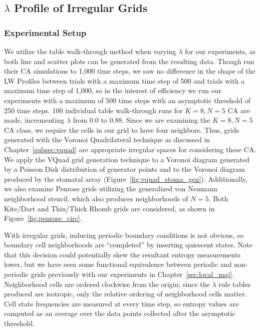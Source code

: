 \documentclass[a4paper,11pt]{article}
\begin{document}
\subsection{$\lambda$ Profile of Irregular Grids}

\subsubsection*{Experimental Setup}

We utilize the table walk-through method when varying $\lambda$ for our experiments, as both line and scatter plots can be generated from the resulting data. Though \citeauthor{wo90} run their CA simulations to 1,000 time steps, we saw no difference in the shape of the LW Profiles between trials with a maximum time step of 500 and trials with a maximum time step of 1,000, so in the interest of efficiency we run our experiments with a maximum of 500 time steps with an asymptotic threshold of 250 time steps. 100 individual table walk-through runs for $K=8, N=5$ CA are made, incrementing $\lambda$ from $0.0$ to $0.88$. Since we are examining the $K=8, N=5$ CA class, we require the cells in our grid to have four neighbors. Thus, grids generated with the Voronoi Quadrilateral technique as discussed in Chapter~\ref{subsec:vquad} are appropriate irregular spaces for considering these CA. We apply the VQuad grid generation technique to a Voronoi diagram generated by a Poisson Disk distribution of generator points and to the Voronoi diagram produced by the stomatal array (Figure~\ref{fig:vquad_stoma_gen}). Additionally, we also examine Penrose grids utilizing the generalized von Neumann neighborhood stencil, which also produces neighborhoods of $N=5$. Both Kite/Dart and Thin/Thick Rhomb grids are considered, as shown in Figure~\ref{fig:penrose_circ}.

With irregular grids, inducing periodic boundary conditions is not obvious, so boundary cell neighborhoods are ``completed'' by inserting quiescent states. Note that this decision could potentially skew the resultant entropy measurements lower, but we have seen some functional equivalence between periodic and non-periodic grids previously with our experiments in Chapter~\ref{sec:local_maj}. Neighborhood cells are ordered clockwise from the origin; since the $\lambda$ rule tables produced are isotropic, only the relative ordering of neighborhood cells matter. Cell state frequencies are measured at every time step, so entropy values are computed as an average over the data points collected after the asymptotic threshold.
\end{document}
